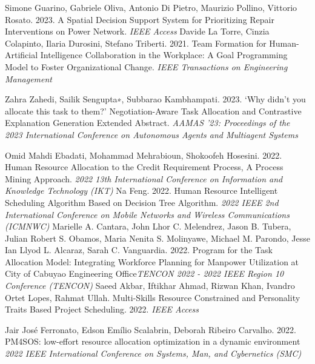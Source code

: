 \documentclass[runningheads]{llncs}
\begin{document}
%
%
%
% 
% 
%
\begin{thebibliography}{8}
Simone Guarino, Gabriele Oliva, Antonio Di Pietro, Maurizio Pollino, Vittorio Rosato. 2023. A Spatial Decision Support System for Prioritizing Repair Interventions on Power Network. \emph{IEEE Access}
Davide La Torre, Cinzia Colapinto, Ilaria Durosini, Stefano Triberti. 2021. Team Formation for Human-Artificial Intelligence Collaboration in the Workplace: A Goal Programming Model to Foster Organizational Change. \emph{IEEE Transactions on Engineering Management}

Zahra Zahedi, Sailik Sengupta∗, Subbarao Kambhampati. 2023. ‘Why didn’t you allocate this task to them?’ Negotiation-Aware Task Allocation and Contrastive Explanation Generation Extended Abstract. \emph{AAMAS '23: Proceedings of the 2023 International Conference on Autonomous Agents and Multiagent Systems}

Omid Mahdi Ebadati, Mohammad Mehrabioun, Shokoofeh Hosesini. 2022. Human Resource Allocation to the Credit Requirement Process, A Process Mining Approach. \emph{2022 13th International Conference on Information and Knowledge Technology (IKT)}
Na Feng. 2022. Human Resource Intelligent Scheduling Algorithm Based on Decision Tree Algorithm. \emph{2022 IEEE 2nd International Conference on Mobile Networks and Wireless Communications (ICMNWC)}
Marielle A. Cantara, John Lhor C. Melendrez, Jason B. Tubera, Julian Robert S. Obamos, Maria Nenita S. Molinyawe, Michael M. Parondo, Jesse Ian Llyod L. Alcaraz, Sarah C. Vanguardia. 2022. Program for the Task Allocation Model: Integrating Workforce Planning for Manpower Utilization at City of Cabuyao Engineering Office\emph{TENCON 2022 - 2022 IEEE Region 10 Conference (TENCON)}
Saeed Akbar, Iftikhar Ahmad, Rizwan Khan, Ivandro Ortet Lopes, Rahmat Ullah. Multi-Skills Resource Constrained and Personality Traits Based Project Scheduling. 2022. \emph{IEEE Access}

Jair José Ferronato, Edson Emílio Scalabrin, Deborah Ribeiro Carvalho. 2022. PM4SOS: low-effort resource allocation optimization in a dynamic environment \emph{2022 IEEE International Conference on Systems, Man, and Cybernetics (SMC)}


\end{thebibliography}
\end{document}
